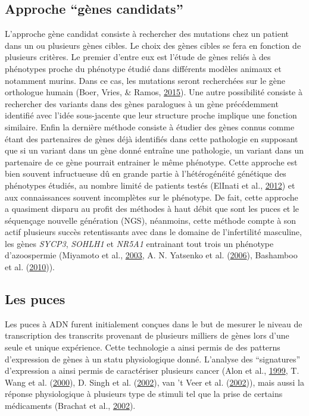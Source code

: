 \documentclass[12pt,twoside]{reedthesis}
\theoremstyle{definition}
\theoremstyle{definition}
\theoremstyle{remark}
\begin{document}
  \subsection{\texorpdfstring{Approche ``gènes
  candidats''}{Approche gènes candidats}}\label{approche-genes-candidats}
  
  L'approche gène candidat consiste à rechercher des mutations chez un
  patient dans un ou plusieurs gènes cibles. Le choix des gènes cibles se
  fera en fonction de plusieurs critères. Le premier d'entre eux est
  l'étude de gènes reliés à des phénotypes proche du phénotype étudié dans
  différents modèles animaux et notamment murins. Dans ce cas, les
  mutations seront recherchées sur le gène orthologue humain (Boer, Vries,
  \& Ramos, \protect\hyperlink{ref-DeBoer2015}{2015}). Une autre
  possibilité consiste à rechercher des variants dans des gènes paralogues
  à un gène précédemment identifié avec l'idée sous-jacente que leur
  structure proche implique une fonction similaire. Enfin la dernière
  méthode consiste à étudier des gènes connus comme étant des partenaires
  de gènes déjà identifiés dans cette pathologie en supposant que si un
  variant dans un gène donné entraîne une pathologie, un variant dans un
  partenaire de ce gène pourrait entrainer le même phénotype. Cette
  approche est bien souvent infructueuse dû en grande partie à
  l'hétérogénéité génétique des phénotypes étudiés, au nombre limité de
  patients testés (ElInati et al.,
  \protect\hyperlink{ref-ElInati2012}{2012}) et aux connaissances souvent
  incomplètes sur le phénotype. De fait, cette approche a quasiment
  disparu au profit des méthodes à haut débit que sont les puces et le
  séquençage nouvelle génération (NGS), néanmoins, cette méthode compte à
  son actif plusieurs succès retentissants avec dans le domaine de
  l'infertilité masculine, les gènes \emph{SYCP3}, \emph{SOHLH1} et
  \emph{NR5A1} entrainant tout trois un phénotype d'azoospermie (Miyamoto
  et al., \protect\hyperlink{ref-Miyamoto2003}{2003}, A. N. Yatsenko et
  al. (\protect\hyperlink{ref-Yatsenko2006}{2006}), Bashamboo et al.
  (\protect\hyperlink{ref-Bashamboo2010}{2010})).
  
  \newpage
  
  \subsection{Les puces}\label{les-puces}
  
  Les puces à ADN furent initialement conçues dans le but de mesurer le
  niveau de transcription des transcrits provenant de plusieurs milliers
  de gènes lors d'une seule et unique expérience. Cette technologie a
  ainsi permis de des patterns d'expression de gènes à un statu
  physiologique donné. L'analyse des ``signatures'' d'expression a ainsi
  permis de caractériser plusieurs cancer (Alon et al.,
  \protect\hyperlink{ref-Alon1999}{1999}, T. Wang et al.
  (\protect\hyperlink{ref-Wang2000}{2000}), D. Singh et al.
  (\protect\hyperlink{ref-Singh2002}{2002}), van 't Veer et al.
  (\protect\hyperlink{ref-VantVeer2002}{2002})), mais aussi la réponse
  physiologique à plusieurs type de stimuli tel que la prise de certains
  médicaments (Brachat et al., \protect\hyperlink{ref-Brachat2002}{2002}).
  
\end{document}
